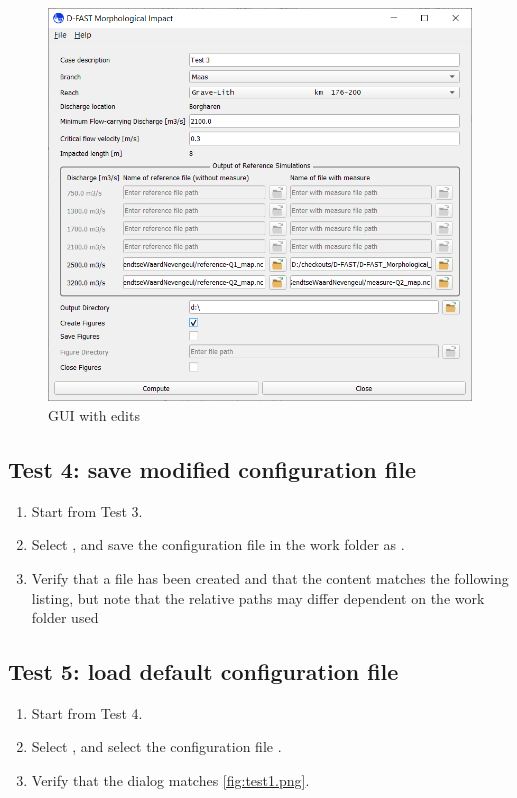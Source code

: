 \begin{enumerate}
\begin{figure}[H]
\includegraphics[width=12cm]{figures/test3.png}
\caption{GUI with edits}
\label{fig:test3.png}
\end{figure}
\end{enumerate}

\subsection{Test 4: save modified configuration file}
\begin{enumerate}
\item Start from Test 3.
\item Select  \textrightarrow {}, and save the configuration file in the work folder as .
\item Verify that a file  has been created and that the content matches the following listing, but note that the relative paths may differ dependent on the work folder used

\end{enumerate}

\subsection{Test 5: load default configuration file}
\begin{enumerate}
\item Start from Test 4.
\item Select  \textrightarrow {}, and select the configuration file .
\item Verify that the dialog matches \autoref{fig:test1.png}.
\end{enumerate}

